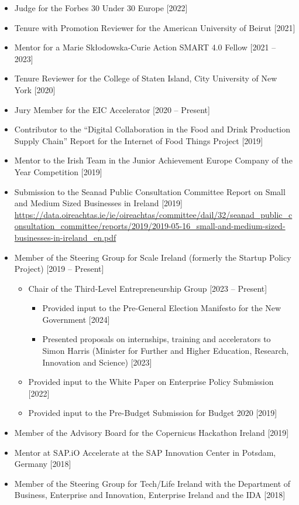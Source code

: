 \documentclass[10pt,a4paper]{res} %
\begin{document}
\begin{resume}
\begin{itemize}
\item Judge for the Forbes 30 Under 30 Europe [2022]
\item Tenure with Promotion Reviewer for the American University of Beirut [2021]
\item Mentor for a Marie Sk\l{}odowska-Curie Action SMART 4.0 Fellow [2021 -- 2023] 
\item Tenure Reviewer for the College of Staten Island, City University of New York [2020]
\item Jury Member for the EIC Accelerator [2020 -- Present]
\item Contributor to the ``Digital Collaboration in the Food and Drink Production Supply Chain'' Report for the Internet of Food Things Project [2019]
\item Mentor to the Irish Team in the Junior Achievement Europe Company of the Year Competition [2019]
\item Submission to the Seanad Public Consultation Committee Report on Small and Medium Sized Businesses in Ireland [2019] \url{https://data.oireachtas.ie/ie/oireachtas/committee/dail/32/seanad_public_consultation_committee/reports/2019/2019-05-16_small-and-medium-sized-businesses-in-ireland_en.pdf}
\item Member of the Steering Group for Scale Ireland (formerly the Startup Policy Project) [2019 -- Present]
\begin{itemize} \itemsep -2pt
\item Chair of the Third-Level Entrepreneurship Group [2023 -- Present]
\begin{itemize} \itemsep -2pt
\item Provided input to the Pre-General Election Manifesto for the New Government [2024]
\item Presented proposals on internships, training and accelerators to Simon Harris (Minister for Further and Higher Education, Research, Innovation and Science) [2023]
\end{itemize}
\item Provided input to the White Paper on Enterprise Policy Submission [2022]
\item Provided input to the Pre-Budget Submission for Budget 2020 [2019]
\end{itemize}
\item Member of the Advisory Board for the Copernicus Hackathon Ireland [2019]
\item Mentor at SAP.iO Accelerate at the SAP Innovation Center in Potsdam, Germany [2018]
\item Member of the Steering Group for Tech/Life Ireland with the Department of Business, Enterprise and Innovation, Enterprise Ireland and the IDA [2018]

\end{itemize}
\end{resume}
\end{document}
